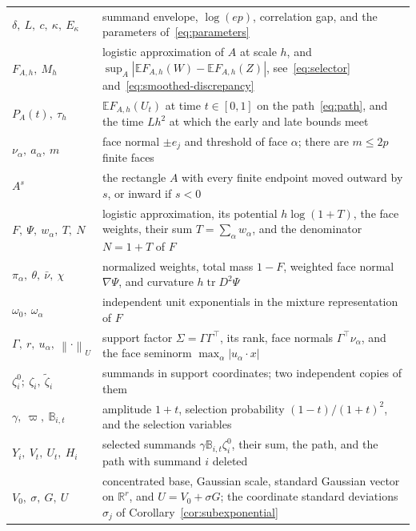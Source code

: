 \documentclass[11pt,letterpaper]{article}
\theoremstyle{remark}
\newcommand{\E}{\mathbb E}
\newcommand{\R}{\mathbb R}
\newcommand{\tr}{\operatorname{tr}}
\newcommand{\norm}[1]{\left\lVert#1\right\rVert}
\begin{document}
\medskip
\begin{center}
\small
\renewcommand{\arraystretch}{1.15}
\begin{tabular}{@{}p{}p{}@{}}
\(\delta,\ L,\ c,\ \kappa,\ E_\kappa\) & summand envelope,
\(\log(ep)\), correlation gap, and the parameters
of~\eqref{eq:parameters}\\
\(F_{A,h},\ M_h\) & logistic approximation of \(A\) at scale
\(h\), and \(\sup_A|\E F_{A,h}(W)-\E F_{A,h}(Z)|\),
see~\eqref{eq:selector} and~\eqref{eq:smoothed-discrepancy}\\
\(P_A(t),\ \tau_h\) & \(\E F_{A,h}(U_t)\) at time \(t\in[0,1]\) on
the path~\eqref{eq:path}, and the time \(Lh^2\) at which the early and
late bounds meet\\
\(\nu_\alpha,\ a_\alpha,\ m\) & face normal \(\pm e_j\) and threshold of
face \(\alpha\); there are \(m\le2p\) finite faces\\
\(A^s\) & the rectangle \(A\) with every finite endpoint moved outward
by \(s\), or inward if \(s<0\)\\
\(F,\ \Psi,\ w_\alpha,\ T,\ N\) & logistic approximation, its potential
\(h\log(1+T)\), the face weights, their sum
\(T=\sum_\alpha w_\alpha\), and the denominator \(N=1+T\) of \(F\)\\
\(\pi_\alpha,\ \theta,\ \bar\nu,\ \chi\) & normalized weights, total
mass \(1-F\), weighted face normal \(\nabla\Psi\), and curvature
\(h\tr D^2\Psi\)\\
\(\omega_0,\ \omega_\alpha\) & independent unit exponentials in the
mixture representation of \(F\)\\
\(\Gamma,\ r,\ u_\alpha,\ \norm\cdot_U\) & support factor
\(\Sigma=\Gamma\Gamma^\top\), its rank, face normals
\(\Gamma^\top\nu_\alpha\), and the face seminorm
\(\max_\alpha|u_\alpha\cdot x|\)\\
\(\zeta_i^0;\ \zeta_i,\ \widetilde\zeta_i\) & summands in support coordinates; two
independent copies of them\\
\(\gamma,\ \varpi,\ \mathbb B_{i,t}\) & amplitude \(1+t\), selection
probability \((1-t)/(1+t)^2\), and the selection variables\\
\(Y_i,\ V_t,\ U_t,\ H_i\) & selected summands
\(\gamma \mathbb B_{i,t}\zeta_i^0\), their sum, the path, and the path with
summand \(i\) deleted\\
\(V_0,\ \sigma,\ G,\ U\) & concentrated base, Gaussian scale, standard
Gaussian vector on \(\R^r\), and \(U=V_0+\sigma G\); the coordinate
standard deviations \(\sigma_j\) of Corollary~\ref{cor:subexponential}

\end{tabular}
\end{center}
\end{document}
